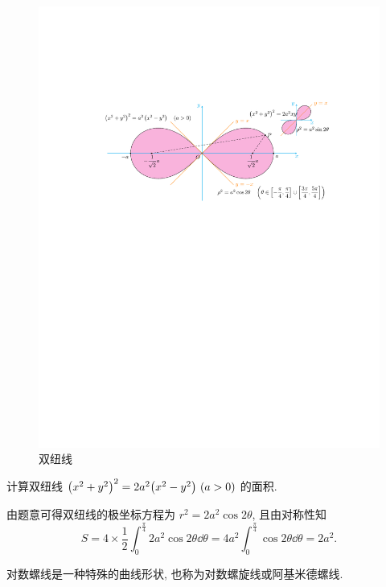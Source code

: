 \begin{figure}[H]
    \centering
    \includegraphics{figures/DoubleTwistedWire.pdf}
    \caption{双纽线}
    \label{doubleTwistedWire}
\end{figure}

\begin{example}
    计算双纽线 $\qty(x^2+y^2)^2=2a^2\qty(x^2-y^2)~(a>0)$ 的面积.
\end{example}
\begin{solution}
    由题意可得双纽线的极坐标方程为 $r^2=2a^2\cos 2\theta$, 且由对称性知
    $$
        S=4\times \dfrac{1}{2}\int_{0}^{\frac{\pi}{4}} 2a^2\cos 2\theta \dd \theta=4a^2\int_{0}^{\frac{\pi}{4}} \cos2\theta \dd \theta=2a^2.
    $$
\end{solution}


对数螺线是一种特殊的曲线形状, 也称为对数螺旋线或阿基米德螺线.

